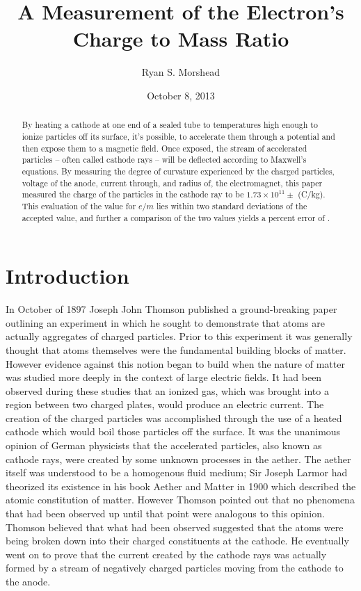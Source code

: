 \documentclass[prb,preprint]{revtex4-1}
\begin{document}
\title{A Measurement of the Electron's Charge to Mass Ratio}

\author{Ryan S. Morshead}

\date{October 8, 2013}

\begin{abstract}
By heating a cathode at one end of a sealed tube to temperatures high enough to ionize particles off its surface, it's possible, to accelerate them through a potential and then expose them to a magnetic field. Once exposed, the stream of accelerated particles -- often called cathode rays -- will be deflected according to Maxwell's equations. By measuring the degree of curvature experienced by the charged particles, voltage of the anode, current through, and radius of, the electromagnet, this paper measured the charge of the particles in the cathode ray to be $1.73\times10^{11}\pm$ (C/kg). This evaluation of the value for $e/m$ lies within two standard deviations of the accepted value, and further a comparison of the two values yields a percent error of $ $.
\end{abstract}


\maketitle


\section{Introduction}

In October of 1897 Joseph John Thomson published a ground-breaking paper outlining an experiment in which he sought to demonstrate that atoms are actually aggregates of charged particles\cite{jjt}. Prior to this experiment it was generally thought that atoms themselves were the fundamental building blocks of matter. However evidence against this notion began to build when the nature of matter was studied more deeply in the context of large electric fields. It had been observed during these studies that an ionized gas, which was brought into a region between two charged plates, would produce an electric current. The creation of the charged particles was accomplished through the use of a heated cathode which would boil those particles off the surface. It was the unanimous opinion of German physicists that the accelerated particles, also known as cathode rays, were created by some unknown processes in the aether\cite{jjt}. The aether itself was understood to be a homogenous fluid medium; Sir Joseph Larmor had theorized its existence in his book Aether and Matter in 1900 which described the atomic constitution of matter. However Thomson pointed out that no phenomena that had been observed up until that point were analogous to this opinion. Thomson believed that what had been observed suggested that the atoms were being broken down into their charged constituents at the cathode. He eventually went on to prove that the current created by the cathode rays was actually formed by a stream of negatively charged particles moving from the cathode to the anode.
\end{document}
